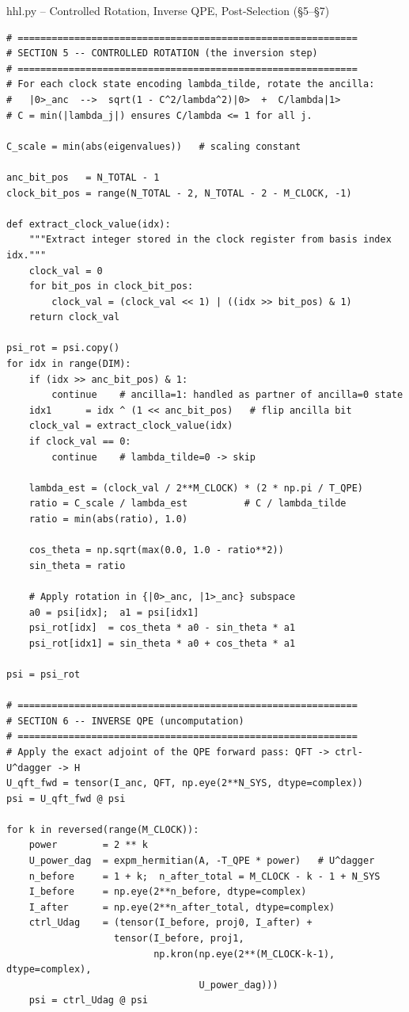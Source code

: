 \documentclass{beamer}
\begin{document}

\begin{frame}{hhl.py -- Controlled Rotation, Inverse QPE, Post-Selection (\S5--\S7)}
\begin{lstlisting}
# ============================================================
# SECTION 5 -- CONTROLLED ROTATION (the inversion step)
# ============================================================
# For each clock state encoding lambda_tilde, rotate the ancilla:
#   |0>_anc  -->  sqrt(1 - C^2/lambda^2)|0>  +  C/lambda|1>
# C = min(|lambda_j|) ensures C/lambda <= 1 for all j.

C_scale = min(abs(eigenvalues))   # scaling constant

anc_bit_pos   = N_TOTAL - 1
clock_bit_pos = range(N_TOTAL - 2, N_TOTAL - 2 - M_CLOCK, -1)

def extract_clock_value(idx):
    """Extract integer stored in the clock register from basis index idx."""
    clock_val = 0
    for bit_pos in clock_bit_pos:
        clock_val = (clock_val << 1) | ((idx >> bit_pos) & 1)
    return clock_val

psi_rot = psi.copy()
for idx in range(DIM):
    if (idx >> anc_bit_pos) & 1:
        continue    # ancilla=1: handled as partner of ancilla=0 state
    idx1      = idx ^ (1 << anc_bit_pos)   # flip ancilla bit
    clock_val = extract_clock_value(idx)
    if clock_val == 0:
        continue    # lambda_tilde=0 -> skip

    lambda_est = (clock_val / 2**M_CLOCK) * (2 * np.pi / T_QPE)
    ratio = C_scale / lambda_est          # C / lambda_tilde
    ratio = min(abs(ratio), 1.0)

    cos_theta = np.sqrt(max(0.0, 1.0 - ratio**2))
    sin_theta = ratio

    # Apply rotation in {|0>_anc, |1>_anc} subspace
    a0 = psi[idx];  a1 = psi[idx1]
    psi_rot[idx]  = cos_theta * a0 - sin_theta * a1
    psi_rot[idx1] = sin_theta * a0 + cos_theta * a1

psi = psi_rot

# ============================================================
# SECTION 6 -- INVERSE QPE (uncomputation)
# ============================================================
# Apply the exact adjoint of the QPE forward pass: QFT -> ctrl-U^dagger -> H
U_qft_fwd = tensor(I_anc, QFT, np.eye(2**N_SYS, dtype=complex))
psi = U_qft_fwd @ psi

for k in reversed(range(M_CLOCK)):
    power        = 2 ** k
    U_power_dag  = expm_hermitian(A, -T_QPE * power)   # U^dagger
    n_before     = 1 + k;  n_after_total = M_CLOCK - k - 1 + N_SYS
    I_before     = np.eye(2**n_before, dtype=complex)
    I_after      = np.eye(2**n_after_total, dtype=complex)
    ctrl_Udag    = (tensor(I_before, proj0, I_after) +
                   tensor(I_before, proj1,
                          np.kron(np.eye(2**(M_CLOCK-k-1), dtype=complex),
                                  U_power_dag)))
    psi = ctrl_Udag @ psi


\end{lstlisting}
\end{frame}
\end{document}
